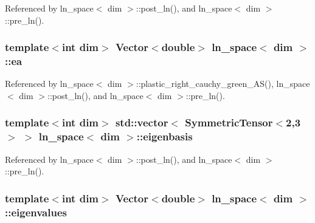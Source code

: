 Referenced by ln\+\_\+space$<$ dim $>$\+::post\+\_\+ln(), and ln\+\_\+space$<$ dim $>$\+::pre\+\_\+ln().

\subsubsection[{\texorpdfstring{ea}{ea}}]{\setlength{\rightskip}{0pt plus 5cm}template$<$int dim$>$ Vector$<$double$>$ {\bf ln\+\_\+space}$<$ dim $>$\+::ea\hspace{0.3cm}{\ttfamily [private]}}\hypertarget{classln__space_add32551f879560be55f3d61a5a368ab4}{}\label{classln__space_add32551f879560be55f3d61a5a368ab4}


Referenced by ln\+\_\+space$<$ dim $>$\+::plastic\+\_\+right\+\_\+cauchy\+\_\+green\+\_\+\+A\+S(), ln\+\_\+space$<$ dim $>$\+::post\+\_\+ln(), and ln\+\_\+space$<$ dim $>$\+::pre\+\_\+ln().

\subsubsection[{\texorpdfstring{eigenbasis}{eigenbasis}}]{\setlength{\rightskip}{0pt plus 5cm}template$<$int dim$>$ std\+::vector$<$ Symmetric\+Tensor$<$2,3$>$ $>$ {\bf ln\+\_\+space}$<$ dim $>$\+::eigenbasis\hspace{0.3cm}{\ttfamily [private]}}\hypertarget{classln__space_a1e67221edabbd2db69aa4a21262bd1f4}{}\label{classln__space_a1e67221edabbd2db69aa4a21262bd1f4}


Referenced by ln\+\_\+space$<$ dim $>$\+::post\+\_\+ln(), and ln\+\_\+space$<$ dim $>$\+::pre\+\_\+ln().

\subsubsection[{\texorpdfstring{eigenvalues}{eigenvalues}}]{\setlength{\rightskip}{0pt plus 5cm}template$<$int dim$>$ Vector$<$double$>$ {\bf ln\+\_\+space}$<$ dim $>$\+::eigenvalues\hspace{0.3cm}{\ttfamily [private]}}\hypertarget{classln__space_aad33c1f308694e2801bbea7730d3b9c6}{}\label{classln__space_aad33c1f308694e2801bbea7730d3b9c6}


